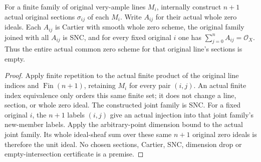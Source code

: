 \begin{theorem}
\label{thm:kn-nadel-bertini-auxiliary-family}
\leanok
{}
For a finite family of original very-ample lines $M_i$, internally
construct $n+1$ actual original sections $\sigma_{ij}$ of each $M_i$.
Write $A_{ij}$ for their actual whole zero ideals. Each $A_{ij}$ is
Cartier with smooth whole zero scheme, the original family joined with
all $A_{ij}$ is SNC, and for every fixed original $i$ one has
$\sum_{j=0}^{n}A_{ij}=\mathcal O_X$. Thus the entire actual common zero
scheme for that original line's sections is empty.
\end{theorem}
\begin{proof}
Apply finite repetition to the actual finite product of the original
line indices and $\operatorname{Fin}(n+1)$, retaining $M_i$ for every
pair $(i,j)$. An actual finite index equivalence only orders this same
finite set; it does not change a line, section, or whole zero ideal.
The constructed joint family is SNC. For a fixed original $i$, the
$n+1$ labels $(i,j)$ give an actual injection into that joint family's
new-member labels. Apply the arbitrary-point dimension bound to the
actual joint family. Its whole ideal-sheaf sum over these same $n+1$
original zero ideals is therefore the unit ideal. No chosen sections,
Cartier, SNC, dimension drop or empty-intersection certificate is a
premise.
\end{proof}
